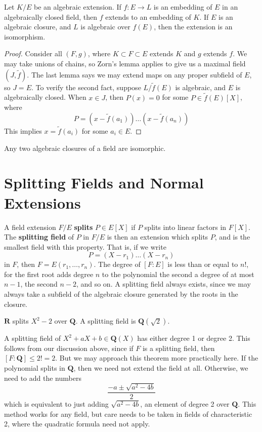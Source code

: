 \begin{theorem}
    Let $K/E$ be an algebraic extension. If $f:E \to L$ is an embedding of $E$ in an algebraically closed field, then $f$ extends to an embedding of $K$. If $E$ is an algebraic closure, and $L$ is algebraic over $f(E)$, then the extension is an isomorphism.
\end{theorem}
\begin{proof}
    Consider all $(F,g)$, where $K \subset F \subset E$ extends $K$ and $g$ extends $f$. We may take unions of chains, so Zorn's lemma applies to give us a maximal field $(J,\tilde{f})$. The last lemma says we may extend maps on any proper subfield of $E$, so $J = E$. To verify the second fact, suppose $L/\tilde{f}(E)$ is algebraic, and $E$ is algebraically closed. When $x \in J$, then $P(x) = 0$ for some $P \in \tilde{f}(E)[X]$, where
    \[ P = (x - \tilde{f}(a_1)) \dots (x - \tilde{f}(a_n)) \]
    This implies $x = \tilde{f}(a_i)$ for some $a_i \in E$.
\end{proof}

\begin{corollary}
    Any two algebraic closures of a field are isomorphic.
\end{corollary}






\section{Splitting Fields and Normal Extensions}

A field extension $F/E$ {\bf splits} $P \in E[X]$ if $P$ splits into linear factors in $F[X]$. The {\bf splitting field} of $P$ in $F/E$ is then an extension which splits $P$, and is the smallest field with this property. That is, if we write
%
\[ P = (X - r_1) \dots (X - r_n) \]
%
in $F$, then $F = E(r_1, \dots, r_n)$. The degree of $[F:E]$ is less than or equal to $n!$, for the first root adds degree $n$ to the polynomial the second a degree of at most $n-1$, the second $n-2$, and so on. A splitting field always exists, since we may always take a subfield of the algebraic closure generated by the roots in the closure.

\begin{example}
    $\mathbf{R}$ splits $X^2 - 2$ over $\mathbf{Q}$. A splitting field is $\mathbf{Q}(\sqrt{2})$.
\end{example}

\begin{example}
    A splitting field of $X^2 + aX + b \in \mathbf{Q}(X)$ has either degree 1 or degree 2. This follows from our discussion above, since if $F$ is a splitting field, then $[F: \mathbf{Q}] \leq 2! = 2$. But we may approach this theorem more practically here. If the polynomial splits in $\mathbf{Q}$, then we need not extend the field at all. Otherwise, we need to add the numbers
    \[ \frac{-a \pm \sqrt{a^2 - 4b}}{2} \]
    which is equivalent to just adding $\sqrt{a^2 - 4b}$, an element of degree 2 over $\mathbf{Q}$. This method works for any field, but care needs to be taken in fields of characteristic 2, where the quadratic formula need not apply.
\end{example}


